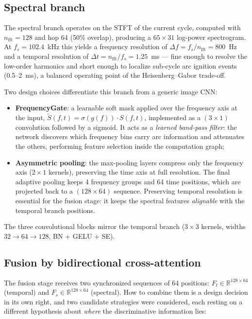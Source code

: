 \subsection{Spectral branch}

The spectral branch operates on the STFT of the current cycle, computed with $n_{\text{fft}} = 128$ and hop 64 (50\% overlap), producing a $65 \times 31$ log-power spectrogram. At $f_s = 102.4$~kHz this yields a frequency resolution of $\Delta f = f_s / n_{\text{fft}} = 800$~Hz and a temporal resolution of $\Delta t = n_{\text{fft}} / f_s = 1.25$~ms --- fine enough to resolve the low-order harmonics and short enough to localize sub-cycle arc ignition events (0.5--2~ms), a balanced operating point of the Heisenberg--Gabor trade-off.

\medskip

Two design choices differentiate this branch from a generic image CNN:

\begin{itemize}[itemsep=2pt]
    \item \textbf{FrequencyGate}: a learnable soft mask applied over the frequency axis at the input, $\tilde{S}(f,t) = \sigma(g(f)) \cdot S(f,t)$, implemented as a $(3 \times 1)$ convolution followed by a sigmoid. It acts as a \emph{learned band-pass filter}: the network discovers which frequency bins carry arc information and attenuates the others, performing feature selection inside the computation graph;
    \item \textbf{Asymmetric pooling}: the max-pooling layers compress only the frequency axis ($2 \times 1$ kernels), preserving the time axis at full resolution. The final adaptive pooling keeps 4 frequency groups and 64 time positions, which are projected back to a $(128 \times 64)$ sequence. Preserving temporal resolution is essential for the fusion stage: it keeps the spectral features \emph{alignable} with the temporal branch positions.
\end{itemize}

The three convolutional blocks mirror the temporal branch ($3 \times 3$ kernels, widths $32 \to 64 \to 128$, BN + GELU + SE).

\subsection{Fusion by bidirectional cross-attention}
\label{sec:cross-attention}

The fusion stage receives two synchronized sequences of 64 positions: $F_t \in \mathbb{R}^{128 \times 64}$ (temporal) and $F_s \in \mathbb{R}^{128 \times 64}$ (spectral). How to combine them is a design decision in its own right, and two candidate strategies were considered, each resting on a different hypothesis about \emph{where} the discriminative information lies:

